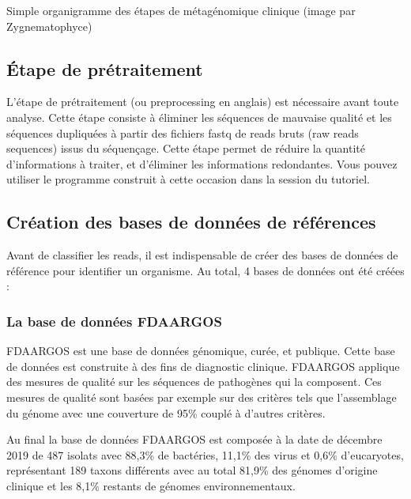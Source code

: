 \documentclass[letterpaper,10pt,french]{sphinxmanual}
\begin{document}
Simple organigramme des étapes de métagénomique clinique (image par Zygnematophyce)


\subsection{Étape de pré\sphinxhyphen{}traitement}
\label{\detokenize{overview:etape-de-pre-traitement}}
L’étape de pré\sphinxhyphen{}traitement (ou pre\sphinxhyphen{}processing en anglais) est nécessaire avant toute analyse. Cette étape consiste à éliminer les séquences de mauvaise qualité et les séquences dupliquées à partir des fichiers fastq de reads bruts (raw reads sequences) issus du séquençage. Cette étape permet de réduire la quantité d’informations à traiter, et d’éliminer les informations redondantes. Vous pouvez utiliser le programme construit à cette occasion dans la session {\hyperref[\detokenize{tutorial:pre-processing}]{}} du tutoriel.


\subsection{Création des bases de données de références}
\label{\detokenize{overview:creation-des-bases-de-donnees-de-references}}
Avant de classifier les reads, il est indispensable de créer des bases de données de référence pour identifier un organisme. Au total, 4 bases de données ont été créées :


\subsubsection{La base de données FDA\sphinxhyphen{}ARGOS}
\label{\detokenize{overview:la-base-de-donnees-fda-argos}}
FDA\sphinxhyphen{}ARGOS est une base de données génomique, curée, et publique. Cette base de
données est construite à des fins de diagnostic clinique. FDA\sphinxhyphen{}ARGOS applique des mesures de qualité sur les séquences de pathogènes qui la composent. Ces mesures de qualité sont basées par exemple sur des critères tels que l’assemblage du génome avec une couverture de 95\% couplé à d’autres critères.

Au final la base de données FDA\sphinxhyphen{}ARGOS est composée à la date de décembre 2019 de 487 isolats avec 88,3\% de bactéries, 11,1\% des virus et 0,6\% d’eucaryotes, représentant 189 taxons différents avec au total 81,9\% des génomes d’origine clinique et les 8,1\% restants de génomes environnementaux.
\end{document}
